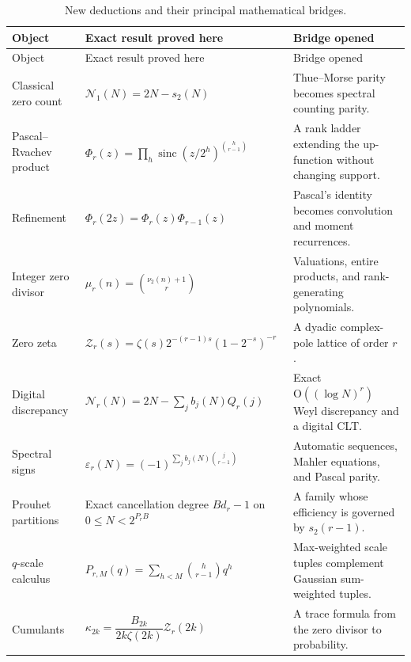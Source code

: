 \documentclass[11pt,a4paper]{article}
\theoremstyle{frontier}
\theoremstyle{definition}
\newcommand{\sinc}{\operatorname{sinc}}
\newcommand{\bigO}{\mathrm O}
\begin{document}
\begin{longtable}{@{}>{\raggedright\arraybackslash}p{}>{\raggedright\arraybackslash}p{}>{\raggedright\arraybackslash}p{}@{}}
\caption{New deductions and their principal mathematical bridges.}\label{tab:result-map}\\
\toprule
Object & Exact result proved here & Bridge opened\\
\midrule
\endfirsthead
\toprule
Object & Exact result proved here & Bridge opened\\
\midrule
\endhead
Classical zero count
& $\mathcal N_1(N)=2N-s_2(N)$
& Thue--Morse parity becomes spectral counting parity.\\

Pascal--Rvachev product
& $\Phi_r(z)=\prod_h\sinc(z/2^h)^{\binom h{r-1}}$
& A rank ladder extending the up-function without changing support.\\

Refinement
& $\Phi_r(2z)=\Phi_r(z)\Phi_{r-1}(z)$
& Pascal's identity becomes convolution and moment recurrences.\\

Integer zero divisor
& $\mu_r(n)=\binom{\nu_2(n)+1}{r}$
& Valuations, entire products, and rank-generating polynomials.\\

Zero zeta
& $\mathcal Z_r(s)=\zeta(s)2^{-(r-1)s}(1-2^{-s})^{-r}$
& A dyadic complex-pole lattice of order $r$.\\

Digital discrepancy
& $\mathcal N_r(N)=2N-\sum_jb_j(N)Q_r(j)$
& Exact $\bigO((\log N)^r)$ Weyl discrepancy and a digital CLT.\\

Spectral signs
& $\varepsilon_r(N)=(-1)^{\sum_jb_j(N)\binom j{r-1}}$
& Automatic sequences, Mahler equations, and Pascal parity.\\

Prouhet partitions
& Exact cancellation degree $Bd_r-1$ on $0\le N<2^{P_rB}$
& A family whose efficiency is governed by $s_2(r-1)$.\\

$q$-scale calculus
& $P_{r,M}(q)=\sum_{h<M}\binom h{r-1}q^h$
& Max-weighted scale tuples complement Gaussian sum-weighted tuples.\\

Cumulants
& $\kappa_{2k}=\dfrac{B_{2k}}{2k\zeta(2k)}\mathcal Z_r(2k)$
& A trace formula from the zero divisor to probability.\\


\end{longtable}
\end{document}
